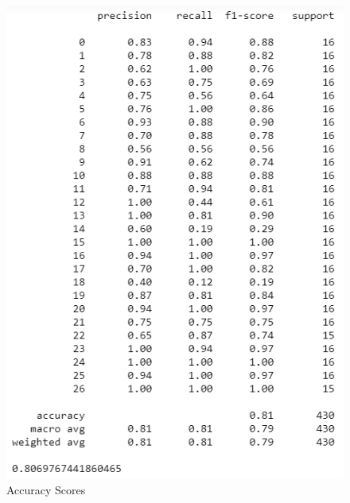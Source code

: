 \documentclass[conference]{IEEEtran}
\begin{document}
 \begin{figure}[H]
\begin{center}
\includegraphics[scale=0.8]{Image/LSTM_Accuracy_Scores.png}
\caption{\label{fig:LSTM_Accuracy_Scores} Accuracy Scores}
\end{center}
\end{figure}
\end{document}

